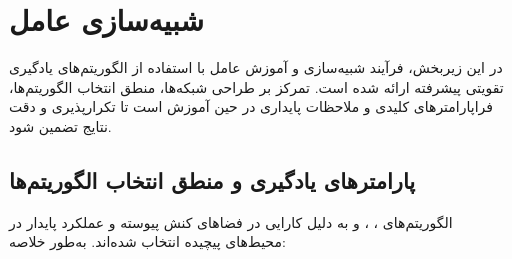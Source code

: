 \section{شبیه‌سازی عامل}\label{sec:agent_sim}

در این زیربخش، فرآیند شبیه‌سازی و آموزش عامل با استفاده از الگوریتم‌های یادگیری تقویتی پیشرفته ارائه شده است. تمرکز بر طراحی شبکه‌ها، منطق انتخاب الگوریتم‌ها، فراپارامترهای کلیدی و ملاحظات پایداری در حین آموزش است تا تکرارپذیری و دقت نتایج تضمین شود.

\subsection{پارامترهای یادگیری و منطق انتخاب الگوریتم‌ها}
الگوریتم‌های ، ،  و  به دلیل کارایی در فضاهای کنش پیوسته و عملکرد پایدار در محیط‌های پیچیده انتخاب شده‌اند. به‌طور خلاصه:

